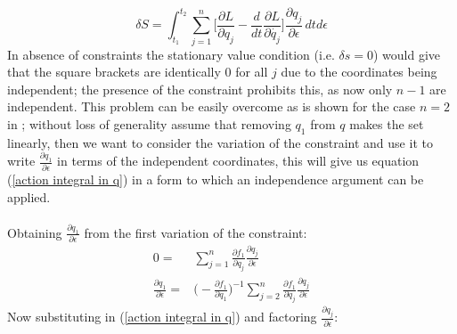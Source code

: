 \documentclass{article}
\begin{document}
\begin{equation}\label{action integral in  q}
    \delta S=\int_{t_1}^{t_2} \sum_{j=1}^{n} \bigg[\frac{\partial L}{\partial {q_j}} -\frac{d}{dt}\frac{\partial L}{\partial \dot{q_j}}\bigg]\frac{\partial q_j}{\partial \epsilon}  \,dtd\epsilon 
\end{equation}
\justify
In absence of constraints the stationary value condition (i.e. $\delta s=0$) would give that the square brackets are identically 0 for all $j$ due to the coordinates being independent; the presence of the constraint prohibits this, as now only $n-1$ are independent. This problem can be easily overcome as is shown for the case $n=2$ in ; without loss of generality assume that removing $q_1$ from $q$ makes the set linearly, then we want to consider the variation of the constraint and use it to write $\frac{\partial q_1}{\partial \epsilon}$ in terms of the independent coordinates, this will give us equation (\ref{action integral in  q}) in a form to which an independence argument can be applied.
\\\\
Obtaining $\frac{\partial q_1}{\partial \epsilon}$ from the first variation of the constraint:
\begin{equation*}
\begin{split}
    0=& \sum_{j=1}^{n} \frac{\partial f_1}{\partial q_j} \frac{\partial q_j}{\partial\epsilon}\\
    \frac{\partial q_1}{\partial \epsilon} =& \bigg(-\frac{\partial f_1}{\partial q_1}  \bigg)^{-1}  \sum_{j=2}^{n} \frac{\partial f_1}{\partial q_j} \frac{\partial q_j}{\partial\epsilon}
\end{split}
\end{equation*}
Now substituting in (\ref{action integral in  q}) and factoring $\frac{\partial q_j}{\partial\epsilon}$:
\end{document}
